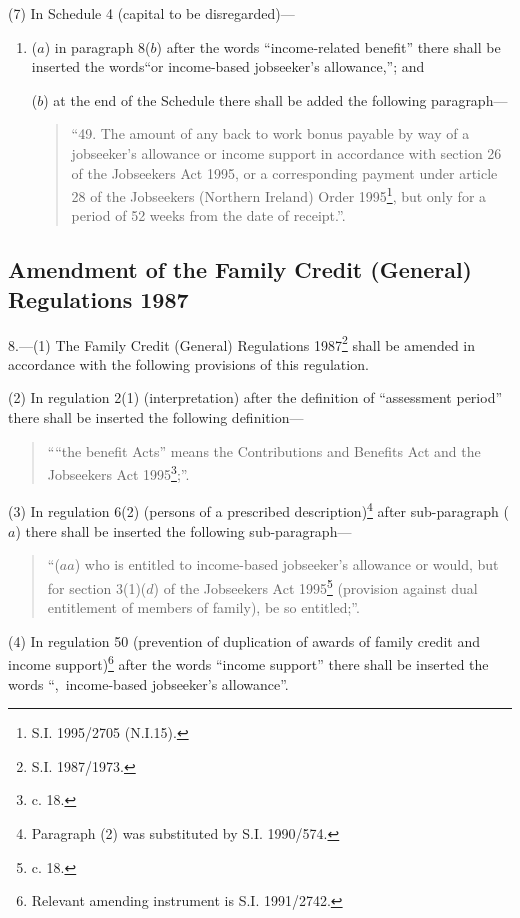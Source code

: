 \documentclass[a4paper]{article}
\begin{document}
(7) In Schedule 4 (capital to be disregarded)—
\begin{enumerate}\item[]
($a$) in paragraph 8($b$) after the words “income-related benefit” there shall be inserted the words“or income-based jobseeker’s allowance,”; and

($b$) at the end of the Schedule there shall be added the following paragraph—
\begin{quotation}
“49.  The amount of any back to work bonus payable by way of a jobseeker’s allowance or income support in accordance with section 26 of the Jobseekers Act 1995, or a corresponding payment under article 28 of the Jobseekers (Northern Ireland) Order 1995\footnote{\frenchspacing S.I. 1995/2705 (N.I.15).}, but only for a period of 52 weeks from the date of receipt.”.
\end{quotation}
\end{enumerate}

\subsection[8. Amendment of the Family Credit (General) Regulations 1987]{Amendment of the Family Credit (General) Regulations 1987}

8.—(1) The Family Credit (General) Regulations 1987\footnote{\frenchspacing S.I. 1987/1973.} shall be amended in accordance with the following provisions of this regulation.

(2) In regulation 2(1) (interpretation) after the definition of “assessment period” there shall be inserted the following definition—
\begin{quotation}
““the benefit Acts” means the Contributions and Benefits Act and the Jobseekers Act 1995\footnote{ c. 18.};”.
\end{quotation}

(3) In regulation 6(2) (persons of a prescribed description)\footnote{\frenchspacing Paragraph (2) was substituted by S.I. 1990/574.} after sub-paragraph ($a$) there shall be inserted the following sub-paragraph—
\begin{quotation}
“($aa$) who is entitled to income-based jobseeker’s allowance or would, but for section 3(1)($d$) of the Jobseekers Act 1995\footnote{ c. 18.} (provision against dual entitlement of members of family), be so entitled;”.
\end{quotation}

(4) In regulation 50 (prevention of duplication of awards of family credit and income support)\footnote{\frenchspacing Relevant amending instrument is S.I. 1991/2742.} after the words “income support” there shall be inserted the words “,~income-based jobseeker’s allowance”.
\end{document}

